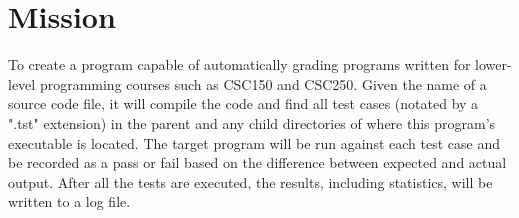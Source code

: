 
\chapter{Mission}

To create a program capable of automatically grading programs written for lower-level programming courses such as CSC150 and CSC250. Given the name of a source code file, it will compile the code and find all test cases (notated by a ".tst" extension) in the parent and any child directories of where this program's executable is located. The target program will be run against each test case and be recorded as a pass or fail based on the difference between expected and actual output. After all the tests are executed, the results, including statistics, will be written to a log file.